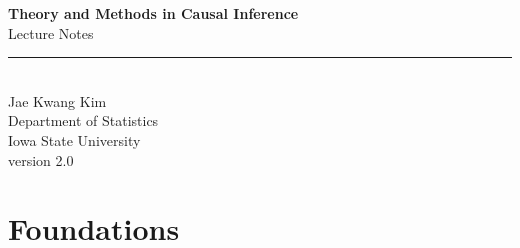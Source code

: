 \documentclass[11pt,a4paper]{book}
\begin{document}
\begin{titlepage}
  \centering
  \vspace*{3cm}
  {\Huge\bfseries\color{isublue}
    Theory and Methods in Causal Inference}\\[1.2cm]
  {\LARGE\color{accent} Lecture Notes}\\[0.8cm]
  \color{accent}\rule{0.6\textwidth}{1.2pt}\\[0.8cm]
  {\large Jae Kwang Kim \\[0.3cm]  Department of Statistics\\[0.3cm]
   Iowa State University}\\[2cm]
  version 2.0
  \vfill
\end{titlepage}

\tableofcontents
\newpage

\part{Foundations}







% 


% 
%
%
%



% 
% 
% 
% 
\end{document}
